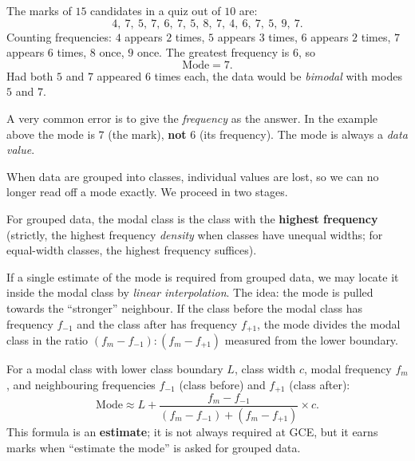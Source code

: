 \documentclass[11pt]{article}
\newcommand{\cle}[1]{{\popxbold\color{popdark}#1}}
\newcounter{popsec}
\newcounter{popsub}
\newcommand{\courssub}[1]{%
  \stepcounter{popsub}%
  \par\vspace{9pt}\noindent{\popxbold\fontsize{11.5}{13}\selectfont\color{popink}{\color{poporange}\thepopsec.\thepopsub}\hspace{6pt}#1}\par\nopagebreak\vspace{4pt}
}
\begin{document}
\begin{exemplebox}
The marks of $15$ candidates in a quiz out of $10$ are:
\[ 4,\ 7,\ 5,\ 7,\ 6,\ 7,\ 5,\ 8,\ 7,\ 4,\ 6,\ 7,\ 5,\ 9,\ 7. \]
Counting frequencies: $4$ appears $2$ times, $5$ appears $3$ times, $6$ appears $2$ times, $7$ appears $6$ times, $8$ once, $9$ once. The greatest frequency is $6$, so
\[ \text{Mode} = 7. \]
Had both $5$ and $7$ appeared $6$ times each, the data would be \emph{bimodal} with modes $5$ and $7$.
\end{exemplebox}

\begin{attention}
A very common error is to give the \emph{frequency} as the answer. In the example above the mode is $7$ (the mark), \textbf{not} $6$ (its frequency). The mode is always a \emph{data value}.
\end{attention}

\courssub{The Modal Class of Grouped Data}

When data are grouped into classes, individual values are lost, so we can no longer read off a mode exactly. We proceed in two stages.

\begin{definition}
For grouped data, the \cle{modal class} is the class with the \textbf{highest frequency} (strictly, the highest frequency \emph{density} when classes have unequal widths; for equal-width classes, the highest frequency suffices).
\end{definition}

If a single estimate of the mode is required from grouped data, we may locate it inside the modal class by \emph{linear interpolation}. The idea: the mode is pulled towards the ``stronger'' neighbour. If the class before the modal class has frequency $f_{-1}$ and the class after has frequency $f_{+1}$, the mode divides the modal class in the ratio $(f_m - f_{-1}) : (f_m - f_{+1})$ measured from the lower boundary.

\begin{propriete}
For a modal class with lower class boundary $L$, class width $c$, modal frequency $f_m$, and neighbouring frequencies $f_{-1}$ (class before) and $f_{+1}$ (class after):
\[ \text{Mode} \approx L + \frac{f_m - f_{-1}}{(f_m - f_{-1}) + (f_m - f_{+1})} \times c. \]
This formula is an \textbf{estimate}; it is not always required at GCE, but it earns marks when ``estimate the mode'' is asked for grouped data.
\end{propriete}
\end{document}
